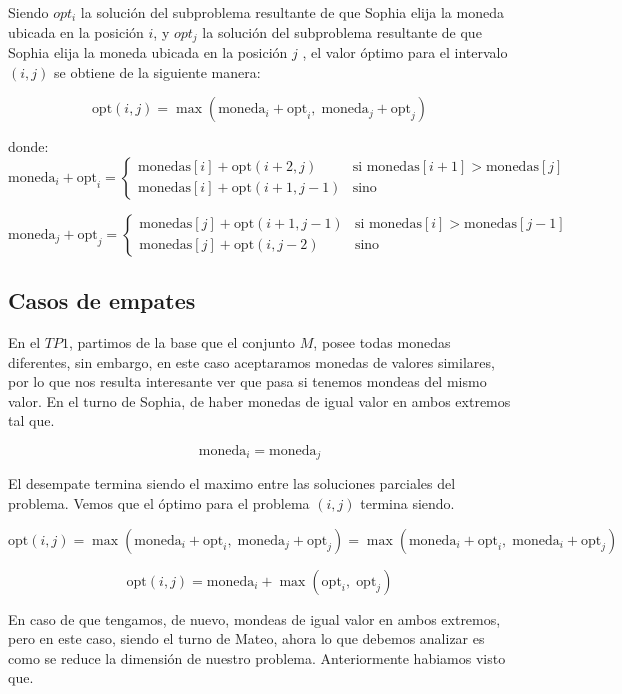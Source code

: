 Siendo $opt_i$ la solución del subproblema resultante de que Sophia elija la moneda ubicada en la posición $i$, y $opt_j$ la solución del subproblema resultante de que Sophia elija la moneda ubicada en la posición $j$ , el valor óptimo para el intervalo $(i,j)$ se obtiene de la siguiente manera:

\[
\text{opt}(i, j) = \max \left( \text{moneda}_i + \text{opt}_i, \; \text{moneda}_j + \text{opt}_j \right)
\]

donde:
\[
\text{moneda}_i + \text{opt}_i = 
\begin{cases} 
\text{monedas}[i] + \text{opt}(i + 2, j) & \text{si } \text{monedas}[i + 1] > \text{monedas}[j] \\[1ex]
\text{monedas}[i] + \text{opt}(i + 1, j - 1) & \text{sino}
\end{cases}
\]

\[
\text{moneda}_j + \text{opt}_j = 
\begin{cases} 
\text{monedas}[j] + \text{opt}(i + 1, j - 1) & \text{si } \text{monedas}[i] > \text{monedas}[j - 1] \\[1ex]
\text{monedas}[j] + \text{opt}(i, j - 2) & \text{sino}
\end{cases}
\]

\subsection{Casos de empates}

En el $TP1$, partimos de la base que el conjunto $M$, posee todas monedas diferentes, sin embargo, en este caso aceptaramos monedas de valores similares, por lo que nos resulta interesante ver que pasa si tenemos mondeas del mismo valor.
En el turno de Sophia, de haber monedas de igual valor en ambos extremos tal que.

\[
\text{moneda}_i = \text{moneda}_j
\]

El desempate termina siendo el maximo entre las soluciones parciales del problema. Vemos que el óptimo para el problema $(i, j)$ termina siendo.

\[
\text{opt}(i, j) = 
\max \left( \text{moneda}_i + \text{opt}_i, \; \text{moneda}_j + \text{opt}_j \right) = 
\max \left( \text{moneda}_i + \text{opt}_i, \; \text{moneda}_i + \text{opt}_j \right)
\]

\[
\text{opt}(i, j) = \text{moneda}_i + \max \left(\text{opt}_i, \;\text{opt}_j \right)
\]

En caso de que tengamos, de nuevo, mondeas de igual valor en ambos extremos, pero en este caso, siendo el turno de Mateo, ahora lo que debemos analizar es como se reduce la dimensión de nuestro problema. Anteriormente habiamos visto que.

